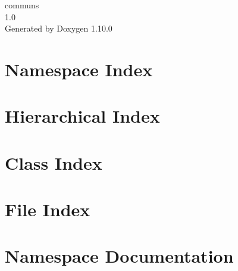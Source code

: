 \documentclass[twoside]{book}
\newcommand{\+}{\discretionary{\mbox{\scriptsize$\hookleftarrow$}}{}{}}
\newcommand{\clearemptydoublepage}{%
    \newpage{\pagestyle{empty}\cleardoublepage}%
  }
\begin{document}
  \raggedbottom
    \hypersetup{pageanchor=false,
                bookmarksnumbered=true,
                pdfencoding=unicode
               }
  \begin{titlepage}
  \vspace*{7cm}
  \begin{center}%
  {\Large communs}\\
  [1ex]\large 1.\+0 \\
  \vspace*{1cm}
  {\large Generated by Doxygen 1.10.0}\\
  \end{center}
  \end{titlepage}
  \clearemptydoublepage
  \tableofcontents
  \clearemptydoublepage
  \hypersetup{pageanchor=true}

\chapter{Namespace Index}

\chapter{Hierarchical Index}

\chapter{Class Index}

\chapter{File Index}

\chapter{Namespace Documentation}



\end{document}
